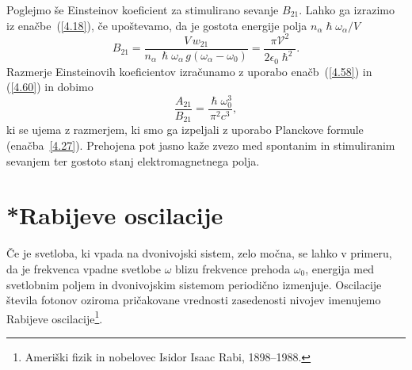 Poglejmo še Einsteinov koeficient za stimulirano sevanje $B_{21}$. Lahko ga 
izrazimo iz enačbe~(\ref{4.18}), če upoštevamo, da je gostota energije 
polja $n_{\alpha}\hslash\omega_{\alpha}/V$
\begin{equation}
B_{21}=\frac{V\,w_{21}}{n_{\alpha}\,\hslash\omega_{\alpha}\, g(\omega_{\alpha}-\omega_0)}
=\frac{\pi \mathcal{V}^{2}}{2\epsilon_{0}\hslash^{2}}.
\label{4.60}
\end{equation}
Razmerje Einsteinovih koeficientov izračunamo z uporabo enačb~(\ref{4.58}) in 
(\ref{4.60}) in dobimo
\begin{equation}
 \frac{A_{21}}{B_{21}}=\frac{\hslash \omega_0^3}{\pi^2 c^3},
\end{equation}
ki se ujema z razmerjem, ki smo ga izpeljali z uporabo
Planckove formule (enačba~\ref{4.27}). Prehojena pot jasno kaže zvezo med spontanim in
stimuliranim sevanjem ter gostoto stanj elektromagnetnega polja. 

\section{*Rabijeve oscilacije}
Če je svetloba, ki vpada na dvonivojski sistem, zelo močna, se lahko v primeru, da je frekvenca 
vpadne svetlobe $\omega$ blizu frekvence prehoda $\omega_0$, energija med 
svetlobnim poljem in dvonivojskim sistemom periodično izmenjuje. 
Oscilacije števila fotonov oziroma pričakovane 
vrednosti zasedenosti nivojev imenujemo Rabijeve 
oscilacije\footnote{Ameriški fizik in nobelovec Isidor Isaac Rabi, 1898--1988.}. 

